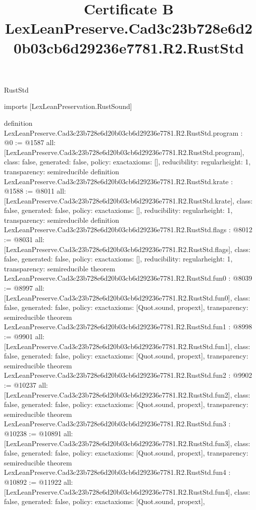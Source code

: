 \begin{lexlean}{RustStd}
\title{Certificate B LexLeanPreserve.Cad3c23b728e6d20b03cb6d29236e7781.R2.RustStd}
\begin{coremodule}
imports [LexLeanPreservation.RustSound]

definition LexLeanPreserve.Cad3c23b728e6d20b03cb6d29236e7781.R2.RustStd.program : @0 := @1587 {
  all: [LexLeanPreserve.Cad3c23b728e6d20b03cb6d29236e7781.R2.RustStd.program],
  class: false,
  generated: false,
  policy: exact{axioms: []},
  reducibility: regular{height: 1},
  transparency: semireducible
}
definition LexLeanPreserve.Cad3c23b728e6d20b03cb6d29236e7781.R2.RustStd.krate : @1588 := @8011 {
  all: [LexLeanPreserve.Cad3c23b728e6d20b03cb6d29236e7781.R2.RustStd.krate],
  class: false,
  generated: false,
  policy: exact{axioms: []},
  reducibility: regular{height: 1},
  transparency: semireducible
}
definition LexLeanPreserve.Cad3c23b728e6d20b03cb6d29236e7781.R2.RustStd.flags : @8012 := @8031 {
  all: [LexLeanPreserve.Cad3c23b728e6d20b03cb6d29236e7781.R2.RustStd.flags],
  class: false,
  generated: false,
  policy: exact{axioms: []},
  reducibility: regular{height: 1},
  transparency: semireducible
}
theorem LexLeanPreserve.Cad3c23b728e6d20b03cb6d29236e7781.R2.RustStd.fun0 : @8039 := @8997 {
  all: [LexLeanPreserve.Cad3c23b728e6d20b03cb6d29236e7781.R2.RustStd.fun0],
  class: false,
  generated: false,
  policy: exact{axioms: [Quot.sound, propext]},
  transparency: semireducible
}
theorem LexLeanPreserve.Cad3c23b728e6d20b03cb6d29236e7781.R2.RustStd.fun1 : @8998 := @9901 {
  all: [LexLeanPreserve.Cad3c23b728e6d20b03cb6d29236e7781.R2.RustStd.fun1],
  class: false,
  generated: false,
  policy: exact{axioms: [Quot.sound, propext]},
  transparency: semireducible
}
theorem LexLeanPreserve.Cad3c23b728e6d20b03cb6d29236e7781.R2.RustStd.fun2 : @9902 := @10237 {
  all: [LexLeanPreserve.Cad3c23b728e6d20b03cb6d29236e7781.R2.RustStd.fun2],
  class: false,
  generated: false,
  policy: exact{axioms: [Quot.sound, propext]},
  transparency: semireducible
}
theorem LexLeanPreserve.Cad3c23b728e6d20b03cb6d29236e7781.R2.RustStd.fun3 : @10238 := @10891 {
  all: [LexLeanPreserve.Cad3c23b728e6d20b03cb6d29236e7781.R2.RustStd.fun3],
  class: false,
  generated: false,
  policy: exact{axioms: [Quot.sound, propext]},
  transparency: semireducible
}
theorem LexLeanPreserve.Cad3c23b728e6d20b03cb6d29236e7781.R2.RustStd.fun4 : @10892 := @11922 {
  all: [LexLeanPreserve.Cad3c23b728e6d20b03cb6d29236e7781.R2.RustStd.fun4],
  class: false,
  generated: false,
  policy: exact{axioms: [Quot.sound, propext]},
}
\end{coremodule}
\end{lexlean}
